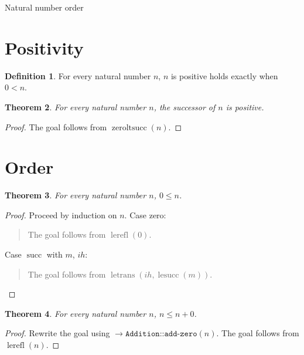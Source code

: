 \documentclass[11pt]{article}
\newtheorem{theorem}{Theorem}[section]
\theoremstyle{definition}
\newtheorem{definition}[theorem]{Definition}
\begin{document}
\begin{center}
{\LARGE Natural number order}
\end{center}
\section{Positivity}
\label{ll:order:positivity}
\begin{definition}
\label{ll:order:positive}
For every natural number \(n\), \(n\) is positive holds exactly when \(0 < n\).
\end{definition}
\begin{theorem}
\label{ll:order:successor-positive}
For every natural number \(n\), the successor of \(n\) is positive.
\end{theorem}
\begin{proof}
The goal follows from \(\operatorname{zeroltsucc}(n)\).
\end{proof}
\section{Order}
\label{ll:order:induction}
\begin{theorem}
\label{ll:order:zero-le}
For every natural number \(n\), \(0 \le n\).
\end{theorem}
\begin{proof}
Proceed by induction on \(n\).
Case zero:
\begin{quote}
The goal follows from \(\operatorname{lerefl}(0)\).
\end{quote}
Case \(\operatorname{succ}\) with \(m\), \(ih\):
\begin{quote}
The goal follows from \(\operatorname{letrans}(ih, \operatorname{lesucc}(m))\).
\end{quote}
\end{proof}
\begin{theorem}
\label{ll:order:le-add-right}
For every natural number \(n\), \(n \le n + 0\).
\end{theorem}
\begin{proof}
Rewrite the goal using \(\rightarrow \texttt{Addition::add-zero}(n)\).
The goal follows from \(\operatorname{lerefl}(n)\).
\end{proof}
\end{document}
